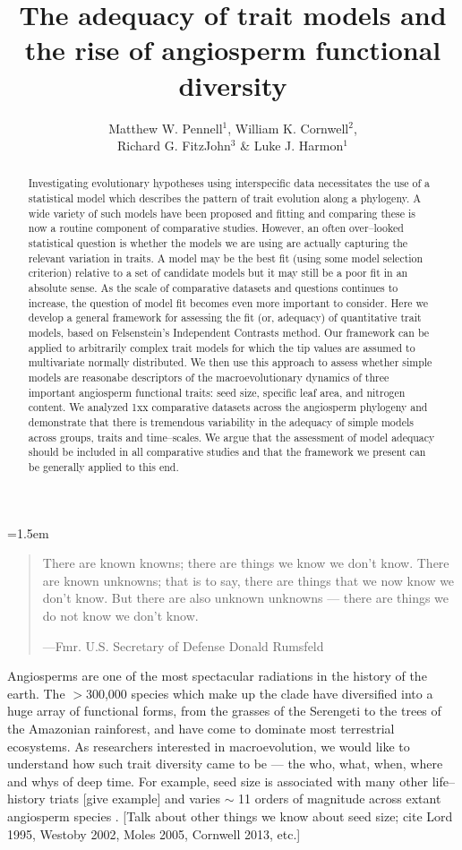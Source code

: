 \documentclass[12pt]{article}
\title{The adequacy of trait models and the rise of angiosperm functional diversity}
\author{
Matthew W. Pennell$^{1}$, William K. Cornwell$^{2}$,\\
Richard G. FitzJohn$^{3}$ \& Luke J. Harmon$^{1}$
}
\date{}
\affiliation{
\begin{center}
\textit{
$^{1}$ Department of Biological Sciences \& Institute for Bioinformatics and Evolutionary Studies, University of Idaho, Moscow, ID 83844, U.S.A.\\[0.5cm]
$^{2}$ School of BEES, University of New South Wales, Sydney, NSW 2052, Australia\\[0.5cm]
$^{3}$ Department of Biological Sciences, Macquarie University, Sydney, NSW 2109, Australia\\[0.5cm]
Email for correspondence: mwpennell@gmail.com}
\end{center}
}
\begin{document}
\mstitlepage
\parindent=1.5em
\addtolength{\parskip}{.3em}

\begin{abstract}
Investigating evolutionary hypotheses using interspecific data necessitates the use of a statistical model which describes the pattern of trait evolution along a phylogeny. A wide variety of such models have been proposed and fitting and comparing these is now a routine component of comparative studies. However, an often over--looked statistical question is whether the models we are using are actually capturing the relevant variation in traits. A model may be the best fit (using some model selection criterion) relative to a set of candidate models but it may still be a poor fit in an absolute sense. As the scale of comparative datasets and questions continues to increase, the question of model fit becomes even more important to consider. Here we develop a general framework for assessing the fit (or, adequacy) of quantitative trait models, based on Felsenstein's Independent Contrasts method. Our framework can be applied to arbitrarily complex trait models for which the tip values are assumed to multivariate normally distributed. We then use this approach to assess whether simple models are reasonabe descriptors of the macroevolutionary dynamics of three important angiosperm functional traits: seed size, specific leaf area, and nitrogen content. We analyzed 1xx comparative datasets across the angiosperm phylogeny and demonstrate that there is tremendous variability in the adequacy of simple models across groups, traits and time--scales. We argue that the assessment of model adequacy should be included in all comparative studies and that the framework we present can be generally applied to this end.  
\end{abstract}

\vfill

\newpage


\begin{quotation}
\noindent There are known knowns; there are things we know we don't know. There are known unknowns; that is to say, there are things that we now know we don't know. But there are also unknown unknowns --- there are things we do not know we don't know. 

---Fmr. U.S. Secretary of Defense Donald Rumsfeld
\end{quotation}


\noident Angiosperms are one of the most spectacular radiations in the history of the earth. The $>$300,000 species which make up the clade have diversified into a huge array of functional forms, from the grasses of the Serengeti to the trees of the Amazonian rainforest, and have come to dominate most terrestrial ecosystems. As researchers interested in macroevolution, we would like to understand how such trait diversity came to be --- the who, what, when, where and whys of deep time. For example, seed size is associated with many other life--history triats [give example] and varies $\sim$ 11 orders of magnitude across extant angiosperm species \citep{Westoby1992TREE, Moles2005}. [Talk about other things we know about seed size; cite Lord 1995, Westoby 2002, Moles 2005, Cornwell 2013, etc.]
\end{document}
